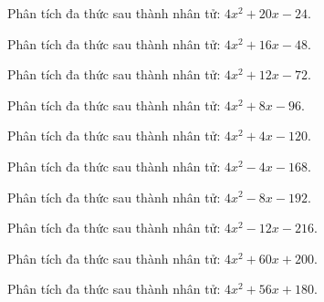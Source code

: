 \begin{bt}
	Phân tích đa thức sau thành nhân tử: $4 x^2 + 20 x - 24$.
\end{bt}
\begin{bt}
	Phân tích đa thức sau thành nhân tử: $4 x^2 + 16 x - 48$.
\end{bt}
\begin{bt}
	Phân tích đa thức sau thành nhân tử: $4 x^2 + 12 x - 72$.
\end{bt}
\begin{bt}
	Phân tích đa thức sau thành nhân tử: $4 x^2 + 8 x - 96$.
\end{bt}
\begin{bt}
	Phân tích đa thức sau thành nhân tử: $4 x^2 + 4 x - 120$.
\end{bt}
\begin{bt}
	Phân tích đa thức sau thành nhân tử: $4 x^2 - 4 x - 168$.
\end{bt}
\begin{bt}
	Phân tích đa thức sau thành nhân tử: $4 x^2 - 8 x - 192$.
\end{bt}
\begin{bt}
	Phân tích đa thức sau thành nhân tử: $4 x^2 - 12 x - 216$.
\end{bt}
\begin{bt}
	Phân tích đa thức sau thành nhân tử: $4 x^2 + 60 x + 200$.
\end{bt}
\begin{bt}
	Phân tích đa thức sau thành nhân tử: $4 x^2 + 56 x + 180$.
\end{bt}
